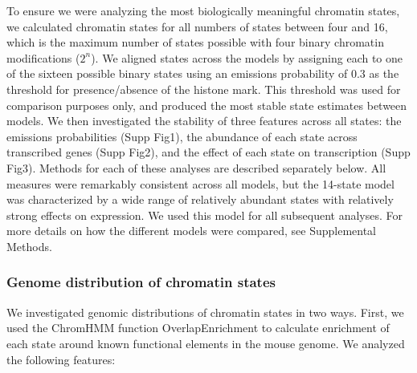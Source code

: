 \documentclass[
  11pt,
]{article}
\begin{document}
To ensure we were analyzing the most biologically meaningful chromatin
states, we calculated chromatin states for all numbers of states between
four and 16, which is the maximum number of states possible with four
binary chromatin modifications (\(2^n\)). We aligned states across the
models by assigning each to one of the sixteen possible binary states
using an emissions probability of 0.3 as the threshold for
presence/absence of the histone mark. This threshold was used for
comparison purposes only, and produced the most stable state estimates
between models. We then investigated the stability of three features
across all states: the emissions probabilities (Supp Fig1), the
abundance of each state across transcribed genes (Supp Fig2), and the
effect of each state on transcription (Supp Fig3). Methods for each of
these analyses are described separately below. All measures were
remarkably consistent across all models, but the 14-state model was
characterized by a wide range of relatively abundant states with
relatively strong effects on expression. We used this model for all
subsequent analyses. For more details on how the different models were
compared, see Supplemental Methods.

\hypertarget{genome-distribution-of-chromatin-states}{%
\subsubsection{Genome distribution of chromatin
states}\label{genome-distribution-of-chromatin-states}}

We investigated genomic distributions of chromatin states in two ways.
First, we used the ChromHMM function OverlapEnrichment to calculate
enrichment of each state around known functional elements in the mouse
genome. We analyzed the following features:
\end{document}
